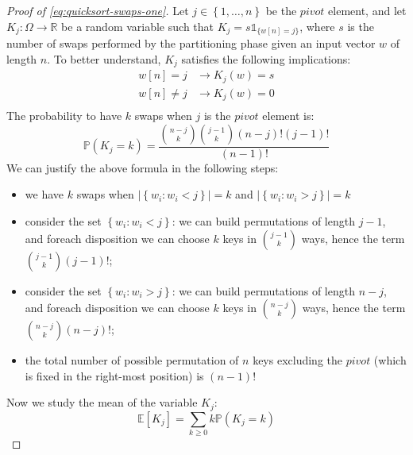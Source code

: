 \begin{proof}[Proof of \autoref{eq:quicksort-swaps-one}]
  Let $j \in \left \lbrace 1,\ldots,n \right\rbrace $ be the $pivot$ element,
  and let $K_j: \Omega \rightarrow \mathbb{R}$ be a random variable
  such that $K_j = s \mathbb{1}_{\lbrace w[n]=j \rbrace}$, where $s$ is
  the number of swaps performed by the partitioning phase given
  an input vector $w$ of length $n$. To better understand, $K_j$ satisfies
  the following implications:
  \begin{displaymath}
    \begin{split}
      w[n] = j &\rightarrow K_j(w) = s \\
      w[n] \not= j &\rightarrow K_j(w) = 0 \\
    \end{split}
  \end{displaymath}
  The probability to have $k$ swaps when $j$ is the $pivot$ element is:
  \begin{displaymath}
    \mathbb{P}\left(K_j = k \right) =  \frac{{{n-j}\choose{k}}
      {{j-1}\choose{k}} (n-j)! (j-1)! }{(n-1)!}
  \end{displaymath}
  We can justify the above formula in the following steps:
  \begin{itemize}
  \item we have $k$ swaps when $\left| \left \lbrace
        w_i : w_i < j \right\rbrace \right| = k$ and
    $\left| \left \lbrace
        w_i : w_i > j \right\rbrace \right| = k$
  \item consider the set $\left \lbrace w_i : w_i < j \right\rbrace$:
    we can build permutations of length $j-1$, and foreach disposition
    we can choose $k$ keys in ${{j-1}\choose{k}}$ ways, hence the term
    ${{j-1}\choose{k}}(j-1)!$;
  \item consider the set $\left \lbrace w_i : w_i > j \right\rbrace$:
    we can build permutations of length $n-j$, and foreach disposition
    we can choose $k$ keys in ${{n-j}\choose{k}}$ ways, hence the term
    ${{n-j}\choose{k}}(n-j)!$;
  \item the total number of possible permutation of $n$ keys excluding
    the $pivot$ (which is fixed in the right-most position) is
    $(n-1)!$
  \end{itemize}
  Now we study the mean of the variable $K_j$:
  \begin{displaymath}
    \mathbb{E} \left[ K_j \right] = \sum_{k \geq 0}{k \mathbb{P}\left(
        K_j = k      \right) }
  \end{displaymath}

\end{proof}
